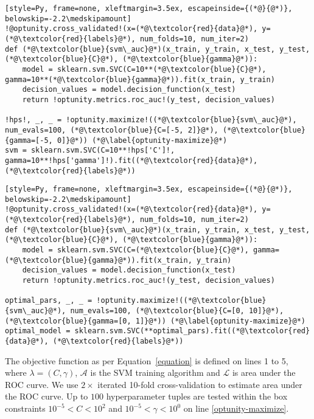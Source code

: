 \documentclass[twoside,11pt]{article}
\begin{document}
\begin{lstlisting}[style=Py, frame=none, xleftmargin=3.5ex, escapeinside={(*@}{@*)}, belowskip=-2.2\medskipamount]
!@optunity.cross_validated!(x=(*@\textcolor{red}{data}@*), y=(*@\textcolor{red}{labels}@*), num_folds=10, num_iter=2)
def (*@\textcolor{blue}{svm\_auc}@*)(x_train, y_train, x_test, y_test, (*@\textcolor{blue}{C}@*), (*@\textcolor{blue}{gamma}@*)):
    model = sklearn.svm.SVC(C=10**(*@\textcolor{blue}{C}@*), gamma=10**(*@\textcolor{blue}{gamma}@*)).fit(x_train, y_train)
    decision_values = model.decision_function(x_test)
    return !optunity.metrics.roc_auc!(y_test, decision_values)

!hps!, _, _ = !optunity.maximize!((*@\textcolor{blue}{svm\_auc}@*), num_evals=100, (*@\textcolor{blue}{C=[-5, 2]}@*), (*@\textcolor{blue}{gamma=[-5, 0]}@*)) (*@\label{optunity-maximize}@*)
svm = sklearn.svm.SVC(C=10**!hps['C']!, gamma=10**!hps['gamma']!).fit((*@\textcolor{red}{data}@*), (*@\textcolor{red}{labels}@*))
\end{lstlisting}
\ifx
\begin{lstlisting}[style=Py, frame=none, xleftmargin=3.5ex, escapeinside={(*@}{@*)}, belowskip=-2.2\medskipamount]
!@optunity.cross_validated!(x=(*@\textcolor{red}{data}@*), y=(*@\textcolor{red}{labels}@*), num_folds=10, num_iter=2)
def (*@\textcolor{blue}{svm\_auc}@*)(x_train, y_train, x_test, y_test, (*@\textcolor{blue}{C}@*), (*@\textcolor{blue}{gamma}@*)):
    model = sklearn.svm.SVC(C=(*@\textcolor{blue}{C}@*), gamma=(*@\textcolor{blue}{gamma}@*)).fit(x_train, y_train)
    decision_values = model.decision_function(x_test)
    return !optunity.metrics.roc_auc!(y_test, decision_values)

optimal_pars, _, _ = !optunity.maximize!((*@\textcolor{blue}{svm\_auc}@*), num_evals=100, (*@\textcolor{blue}{C=[0, 10]}@*), (*@\textcolor{blue}{gamma=[0, 1]}@*)) (*@\label{optunity-maximize}@*)
optimal_model = sklearn.svm.SVC(**optimal_pars).fit((*@\textcolor{red}{data}@*), (*@\textcolor{red}{labels}@*))
\end{lstlisting}
\fi

The objective function as per Equation~\eqref{equation} is defined on lines 1 to 5, where $\lambda = (C, \gamma)$, $\mathcal{A}$ is the SVM training algorithm and $\mathcal{L}$ is area under the ROC curve. We use $2\times$ iterated 10-fold cross-validation to estimate area under the ROC curve. Up to $100$ hyperparameter tuples are tested within the box constraints $10^{-5} < C < 10^2$ and $10^{-5} < \gamma < 10^0$ on line \ref{optunity-maximize}.
\end{document}
